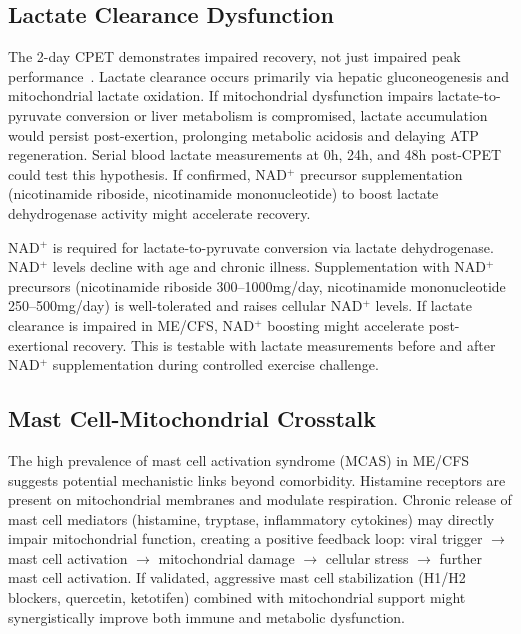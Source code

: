 \subsection{Lactate Clearance Dysfunction}
\label{subsec:lactate-clearance}

\begin{hypothesis}
\label{hyp:lactate-clearance}
The 2-day CPET demonstrates impaired recovery, not just impaired peak performance~\cite{Lim2020}. Lactate clearance occurs primarily via hepatic gluconeogenesis and mitochondrial lactate oxidation. If mitochondrial dysfunction impairs lactate-to-pyruvate conversion or liver metabolism is compromised, lactate accumulation would persist post-exertion, prolonging metabolic acidosis and delaying ATP regeneration. Serial blood lactate measurements at 0h, 24h, and 48h post-CPET could test this hypothesis. If confirmed, NAD$^+$ precursor supplementation (nicotinamide riboside, nicotinamide mononucleotide) to boost lactate dehydrogenase activity might accelerate recovery.
\end{hypothesis}

\begin{speculation}
\label{spec:nad-lactate}
NAD$^+$ is required for lactate-to-pyruvate conversion via lactate dehydrogenase. NAD$^+$ levels decline with age and chronic illness. Supplementation with NAD$^+$ precursors (nicotinamide riboside 300--1000mg/day, nicotinamide mononucleotide 250--500mg/day) is well-tolerated and raises cellular NAD$^+$ levels. If lactate clearance is impaired in ME/CFS, NAD$^+$ boosting might accelerate post-exertional recovery. This is testable with lactate measurements before and after NAD$^+$ supplementation during controlled exercise challenge.
\end{speculation}

\subsection{Mast Cell-Mitochondrial Crosstalk}
\label{subsec:mcas-mito}

\begin{hypothesis}
\label{hyp:mcas-mito-damage}
The high prevalence of mast cell activation syndrome (MCAS) in ME/CFS suggests potential mechanistic links beyond comorbidity. Histamine receptors are present on mitochondrial membranes and modulate respiration. Chronic release of mast cell mediators (histamine, tryptase, inflammatory cytokines) may directly impair mitochondrial function, creating a positive feedback loop: viral trigger $\rightarrow$ mast cell activation $\rightarrow$ mitochondrial damage $\rightarrow$ cellular stress $\rightarrow$ further mast cell activation. If validated, aggressive mast cell stabilization (H1/H2 blockers, quercetin, ketotifen) combined with mitochondrial support might synergistically improve both immune and metabolic dysfunction.
\end{hypothesis}

